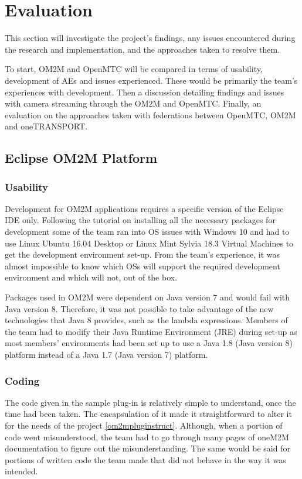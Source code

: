 \chapter{Evaluation}

This section will investigate the project's findings, any issues encountered during the research and implementation, and the approaches taken to resolve them.

To start, OM2M and OpenMTC will be compared in terms of usability, development of AEs and issues experienced. These would be primarily the team's experiences with development. Then a discussion detailing findings and issues with camera streaming through the OM2M and OpenMTC. Finally, an evaluation on the approaches taken with federations between OpenMTC, OM2M and oneTRANSPORT.

\section{Eclipse OM2M Platform}

\subsection{Usability}

Development for OM2M applications requires a specific version of the Eclipse IDE only. Following the tutorial on installing all the necessary packages for development some of the team ran into OS issues with Windows 10 and had to use Linux Ubuntu 16.04 Desktop or Linux Mint Sylvia 18.3 Virtual Machines to get the development environment set-up. From the team's experience, it was almost impossible to know which OSs will support the required development environment and which will not, out of the box.

Packages used in OM2M were dependent on Java version 7 and would fail with Java version 8. Therefore, it was not possible to take advantage of the new technologies that Java 8 provides, such as the lambda expressions. Members of the team had to modify their Java Runtime Environment (JRE) during set-up as most members' environments had been set up to use a Java 1.8 (Java version 8) platform instead of a Java 1.7 (Java version 7) platform. 

\subsection{Coding}

The code given in the sample plug-in is relatively simple to understand, once the time had been taken. The encapsulation of it made it straightforward to alter it for the needs of the project \ref{om2mpluginstruct}. Although, when a portion of code went misunderstood, the team had to go through many pages of oneM2M documentation to figure out the misunderstanding. The same would be said for portions of written code the team made that did not behave in the way it was intended.

